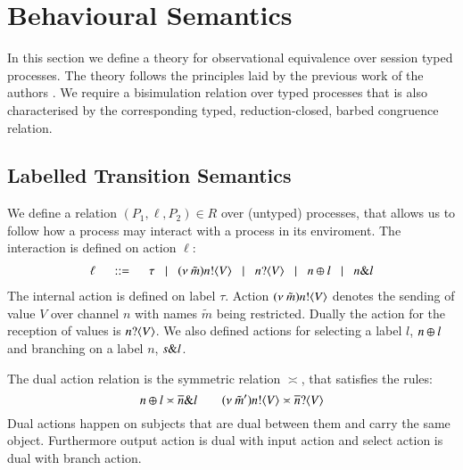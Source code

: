 \section{Behavioural Semantics}
\label{sec:beh_sem}

In this section we define a theory for observational equivalence over
session typed \HOp processes. The theory follows the principles
laid by the previous work of the authors
\cite{DBLP:conf/forte/KouzapasYH11,KY13,dkphdthesis}.
We require a bisimulation relation over typed processes that
is also characterised by the corresponding typed, reduction-closed,
barbed congruence relation.


\subsection{Labelled Transition Semantics}\label{ss:lts}

We define a relation $(P_1, \ell, P_2) \in R$ over
(untyped) processes, that allows us to follow how a process may
interact with a process in its enviroment. The interaction
is defined on action $\ell$:
%
\[
	\begin{array}{rcl}
		\ell	& \;\;::=\;\;  & \tau 
		\;\;\;|\;\;\; (\nu\ \tilde{m}) n ! \langle V \rangle 
		\;\;\;|\;\;\;n ? \langle V \rangle 
		\;\;\;|\;\;\; n \oplus l 
		\;\;\;|\;\;\; n \& l 
	\end{array}
\]
%
\noi The internal action is defined on label $\tau$.
Action $(\nu\ \tilde{m}) n ! \langle V \rangle$ denotes the sending of value $V$ over channel $n$ with
names $\tilde{m}$ being restricted.
Dually the action for the reception of values is 
$n ? \langle V \rangle$.
We also defined actions for selecting a label $l$, $n \oplus l$ and branching on a label
$n$, $s \& l$.

The dual action relation is the symmetric relation $\asymp$, that satisfies the rules:
%
\[
	n \oplus l \asymp \overline{n} \& l
	\qquad
	(\nu\ \tilde{m}') n ! \langle V \rangle \asymp \overline{n} ? \langle V \rangle
\]
%
Dual actions happen on subjects that are dual between them and carry the same
object. Furthermore output action is dual with input action and 
select action is dual with branch action.



